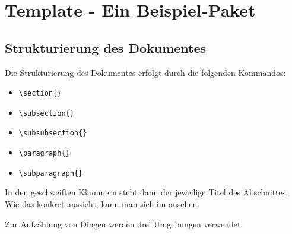 \section {Template - Ein Beispiel-Paket}

\subsection {Strukturierung des Dokumentes}

Die Strukturierung des Dokumentes erfolgt durch die folgenden
Kommandos:
\begin{itemize}
\item \verb*?\section{}?
\item \verb*?\subsection{}?
\item \verb*?\subsubsection{}?
\item \verb*?\paragraph{}?
\item \verb*?\subparagraph{}?
\end{itemize}

In den geschweiften Klammern steht dann der jeweilige Titel des
Abschnittes. Wie das konkret aussieht, kann man sich im
 ansehen.

Zur Aufzählung von Dingen werden drei Umgebungen verwendet:

